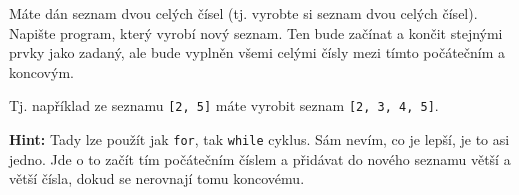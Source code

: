 \question[70]
Máte dán seznam dvou celých čísel (tj. vyrobte si seznam dvou celých čísel).
Napište program, který vyrobí nový seznam. Ten bude začínat a končit stejnými
prvky jako zadaný, ale bude vyplněn všemi celými čísly mezi tímto počátečním a
koncovým.

Tj. například ze seznamu \texttt{[2, 5]} máte vyrobit seznam \texttt{[2, 3, 4,
5]}.

\textbf{Hint:} Tady lze použít jak \texttt{for}, tak \texttt{while} cyklus. Sám
nevím, co je lepší, je to asi jedno. Jde o to začít tím počátečním číslem a
přidávat do nového seznamu větší a větší čísla, dokud se nerovnají tomu koncovému.